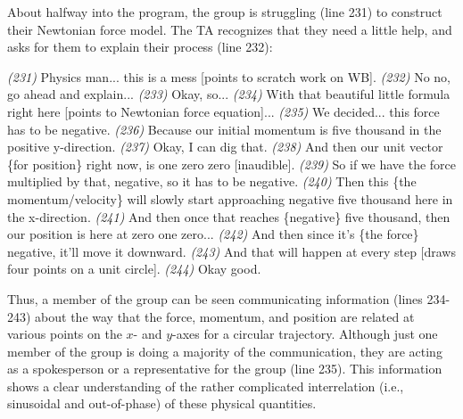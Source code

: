 \documentclass{msuphddissertation}
\begin{document}
\begin{doublespace}
About halfway into the program, the group is struggling (line 231) to construct their Newtonian force model.  The TA recognizes that they need a little help, and asks for them to explain their process (line 232):\begin{description}
\SB \textit{(231)} Physics man... this is a mess [points to scratch work on WB].
\TA \textit{(232)} No no, go ahead and explain...
\SB \textit{(233)} Okay, so...		
\SB \textit{(234)} With that beautiful little formula right here [points to Newtonian force equation]...	
\SB \textit{(235)} We decided... this {force} has to be negative.
\SB \textit{(236)} Because our initial momentum is five thousand in the positive y-direction.		
\TA \textit{(237)} Okay, I can dig that.
\SB \textit{(238)} And then our unit vector \{for position\} right now, is one zero zero [inaudible].
\SB \textit{(239)} So if we have the force multiplied by that, negative, so it has to be negative.		
\SB \textit{(240)} Then this \{the momentum/velocity\} will slowly start approaching negative five thousand here {in the x-direction}.
\SB \textit{(241)} And then once that reaches \{negative\} five thousand, then our position is here {at zero one zero}...		
\SB \textit{(242)} And then since it's \{the force\} negative, it'll move it downward.
\SB \textit{(243)} And that will happen at every step [draws four points on a unit circle].
\TA \textit{(244)} Okay good.			
\end{description}  Thus, a member of the group can be seen communicating information (lines 234-243) about the way that the force, momentum, and position are related at various points on the $x$- and $y$-axes for a circular trajectory.  Although just one member of the group is doing a majority of the communication, they are acting as a spokesperson or a representative for the group (line 235).  This information shows a clear understanding of the rather complicated interrelation (i.e., sinusoidal and out-of-phase) of these physical quantities.


\end{doublespace}
\end{document}
